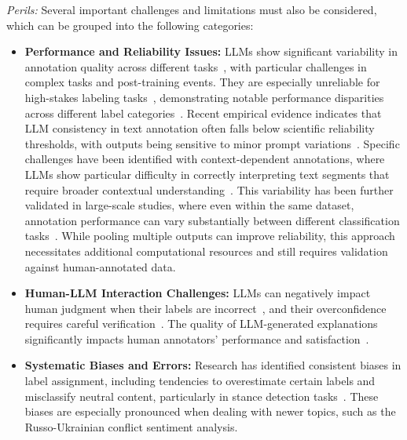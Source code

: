 \documentclass[11pt]{article}
\begin{document}
\emph{Perils:} Several important challenges and limitations must also be considered, which can be grouped into the following categories:

\begin{itemize}
    \item \textbf{Performance and Reliability Issues:} LLMs show significant variability in annotation quality across different tasks~\cite{DBLP:conf/www/HuangKA23a,DBLP:conf/chi/Wang0RMM24}, with particular challenges in complex tasks and post-training events. They are especially unreliable for high-stakes labeling tasks~\cite{DBLP:conf/chi/Wang0RMM24}, demonstrating notable performance disparities across different label categories~\cite{DBLP:journals/corr/abs-2304-10145}. Recent empirical evidence indicates that LLM consistency in text annotation often falls below scientific reliability thresholds, with outputs being sensitive to minor prompt variations~\cite{DBLP:journals/corr/abs-2304-11085}. Specific challenges have been identified with context-dependent annotations, where LLMs show particular difficulty in correctly interpreting text segments that require broader contextual understanding~\cite{DBLP:conf/chi/HeHDRH24}. This variability has been further validated in large-scale studies, where even within the same dataset, annotation performance can vary substantially between different classification tasks~\cite{DBLP:journals/corr/abs-2306-00176}. While pooling multiple outputs can improve reliability, this approach necessitates additional computational resources and still requires validation against human-annotated data.

    \item \textbf{Human-LLM Interaction Challenges:} LLMs can negatively impact human judgment when their labels are incorrect~\cite{DBLP:conf/www/HuangKA23a}, and their overconfidence requires careful verification~\cite{DBLP:conf/kdd/WanSJKCNSSWYABJ24}. The quality of LLM-generated explanations significantly impacts human annotators' performance and satisfaction~\cite{DBLP:conf/chi/Wang0RMM24}.

    \item \textbf{Systematic Biases and Errors:} Research has identified consistent biases in label assignment, including tendencies to overestimate certain labels and misclassify neutral content, particularly in stance detection tasks~\cite{DBLP:journals/corr/abs-2304-10145}. These biases are especially pronounced when dealing with newer topics, such as the Russo-Ukrainian conflict sentiment analysis.


\end{itemize}
\end{document}

